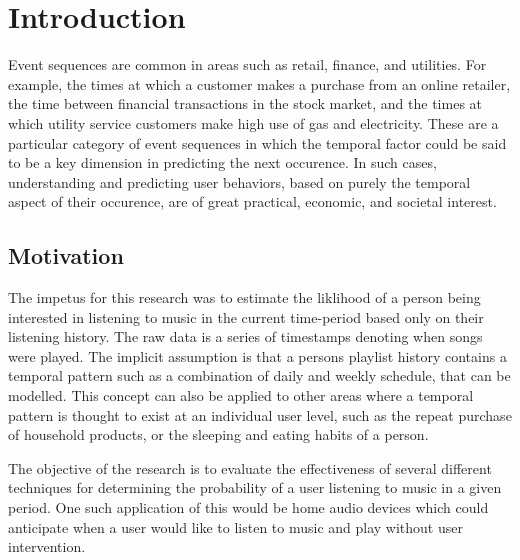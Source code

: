 
\chapter{Introduction} %

\label{Chapter1} %


\newcommand{\keyword}[1]{\textbf{#1}}
\newcommand{\tabhead}[1]{\textbf{#1}}
\newcommand{\code}[1]{\texttt{#1}}
\newcommand{\file}[1]{\texttt{\bfseries#1}}
\newcommand{\option}[1]{\texttt{\itshape#1}}


Event sequences are common in areas such as retail, finance, and utilities.
For example, the times at which a customer makes a purchase from an online retailer, the time between financial transactions in the stock market, and the times at which utility service customers make high use of gas and electricity. These are a particular category of event sequences in which the temporal factor could be said to be a key dimension in predicting the next occurence. In such cases, understanding and predicting user behaviors, based on purely the temporal aspect of their occurence, are of great practical, economic, and societal interest.

\section{Motivation}
The impetus for this research was to estimate the liklihood of a person being interested in listening to music in the current time-period based only on their listening history. The raw data is a series of timestamps denoting when songs were played. The implicit assumption is that a persons playlist history contains a temporal pattern such as a combination of daily and weekly schedule, that can be modelled. This concept can also be applied to other areas where a temporal pattern is thought to exist at an individual user level, such as the repeat purchase of household products, or the sleeping and eating habits of a person.

The objective of the research is to evaluate the effectiveness of several different techniques for determining the probability of a user listening to music in a given period. One such application of this would be home audio devices which could anticipate when a user would like to listen to music and play without user intervention.

